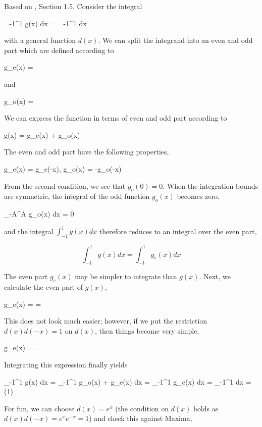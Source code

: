 
Based on \cite{nahin2020inside}, Section 1.5. Consider the integral

\bee
\int_{-1}^1 g(x) dx = \int_{-1}^1  dx
\eee

with a general function $d(x)$. We can split the integrand into an even and odd part which are defined according to

\bee
g_e(x) = 
\eee

and

\bee
g_o(x) = 
\eee

We can express the function in terms of even and odd part according to

\bee
g(x) = g_e(x) + g_o(x)
\eee

The even and odd part have the following properties,

\bee
g_e(x) = g_e(-x), \quad g_o(x) = -g_o(-x)
\eee

From the second condition, we see that $g_o(0) = 0$. When the integration bounds are symmetric, the integral of the odd function $g_o(x)$ becomes zero,

\bee
\int_{-A}^A g_o(x) dx = 0
\eee

and the integral $\int_{-1}^1 g(x) dx$ therefore reduces to an integral over the even part,

\[
\int_{-1}^1 g(x) dx = \int_{-1}^1 g_e(x) dx
\]

The even part $g_e(x)$ may be simpler to integrate than $g(x)$. Next, we calculate the even part of $g(x)$,

\bee
g_e(x) =   =   
\eee

This does not look much easier; however, if we put the restriction $d(x)d(-x) = 1$ on $d(x)$, then things become very simple,

\bee
g_e(x) =    = 
\eee

Integrating this expression finally yields

\bee
\int_{-1}^1 g(x) dx = \int_{-1}^1 g_o(x) + g_e(x) dx = \int_{-1}^1 g_e(x) dx = \int_{-1}^1  dx = \sin(1)
\eee

For fun, we can choose $d(x) = e^x$ (the condition on $d(x)$ holds as $d(x)d(-x) = e^x e^{-x} = 1$) and check this against Maxima,

